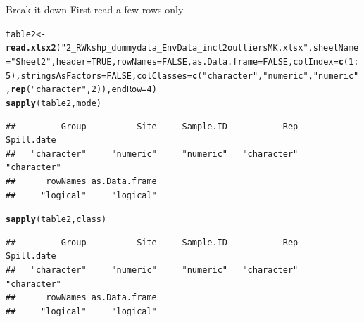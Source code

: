\documentclass[10pt,handout,english]{beamer}\usepackage[]{graphicx}\usepackage[]{color}
\makeatletter
\newcommand{\hlnum}[1]{\textcolor[rgb]{0.686,0.059,0.569}{#1}}%
\newcommand{\hlstr}[1]{\textcolor[rgb]{0.192,0.494,0.8}{#1}}%
\newcommand{\hlopt}[1]{\textcolor[rgb]{0,0,0}{#1}}%
\newcommand{\hlstd}[1]{\textcolor[rgb]{0.345,0.345,0.345}{#1}}%
\newcommand{\hlkwb}[1]{\textcolor[rgb]{0.69,0.353,0.396}{#1}}%
\newcommand{\hlkwc}[1]{\textcolor[rgb]{0.333,0.667,0.333}{#1}}%
\newcommand{\hlkwd}[1]{\textcolor[rgb]{0.737,0.353,0.396}{\textbf{#1}}}%
\newenvironment{kframe}{%
 \def\at@end@of@kframe{}%
 \ifinner\ifhmode%
  \def\at@end@of@kframe{\end{minipage}}%
  \begin{minipage}{\columnwidth}%
 \fi\fi%
 \def\FrameCommand##1{\hskip\@totalleftmargin \hskip-\fboxsep
 \colorbox{shadecolor}{##1}\hskip-\fboxsep
     \hskip-\linewidth \hskip-\@totalleftmargin \hskip\columnwidth}%
 \MakeFramed {\advance\hsize-\width
   \@totalleftmargin\z@ \linewidth\hsize
   \@setminipage}}%
 {\par\unskip\endMakeFramed%
 \at@end@of@kframe}
\newenvironment{knitrout}{}{} %
\makeatother
\begin{document}
\begin{frame}[fragile]
\begin{block}{Break it down}
First read a few rows only
\end{block}
\begin{knitrout}
\color{fgcolor}\begin{kframe}
\begin{alltt}
\hlstd{table2}\hlkwb{<-}\hlkwd{read.xlsx2}\hlstd{(}\hlstr{"2_R Wkshp_dummy data_Env Data_incl2outliersMK.xlsx"}\hlstd{,} \hlkwc{sheetName} \hlstd{=} \hlstr{"Sheet2"}\hlstd{,}\hlkwc{header}\hlstd{=}\hlnum{TRUE}\hlstd{,}\hlkwc{rowNames}\hlstd{=}\hlnum{FALSE}\hlstd{,}\hlkwc{as.Data.frame}\hlstd{=}\hlnum{FALSE}\hlstd{,}\hlkwc{colIndex}\hlstd{=}\hlkwd{c}\hlstd{(}\hlnum{1}\hlopt{:}\hlnum{5}\hlstd{),}\hlkwc{stringsAsFactors}\hlstd{=}\hlnum{FALSE}\hlstd{,}\hlkwc{colClasses}\hlstd{=}\hlkwd{c}\hlstd{(}\hlstr{"character"}\hlstd{,}\hlstr{"numeric"}\hlstd{,}\hlstr{"numeric"}\hlstd{,}\hlkwd{rep}\hlstd{(}\hlstr{"character"}\hlstd{,}\hlnum{2}\hlstd{)),}\hlkwc{endRow}\hlstd{=}\hlnum{4}\hlstd{)}
\hlkwd{sapply}\hlstd{(table2,mode)}
\end{alltt}
\begin{verbatim}
##         Group          Site     Sample.ID           Rep    Spill.date 
##   "character"     "numeric"     "numeric"   "character"   "character" 
##      rowNames as.Data.frame 
##     "logical"     "logical"
\end{verbatim}
\begin{alltt}
\hlkwd{sapply}\hlstd{(table2,class)}
\end{alltt}
\begin{verbatim}
##         Group          Site     Sample.ID           Rep    Spill.date 
##   "character"     "numeric"     "numeric"   "character"   "character" 
##      rowNames as.Data.frame 
##     "logical"     "logical"
\end{verbatim}
\end{kframe}
\end{knitrout}
\clearpage
\end{frame}
\end{document}
